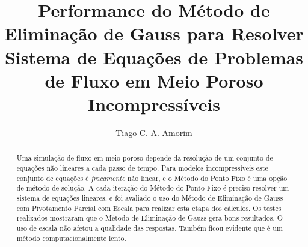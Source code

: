 \documentclass[final,5p]{elsarticle}
\numberwithin{equation}{section}
\begin{document}
\begin{frontmatter}



\title{Performance do Método de Eliminação de Gauss para Resolver Sistema de Equações de Problemas de Fluxo em Meio Poroso Incompressíveis}


\author{Tiago C. A. Amorim}

\begin{abstract}

    Uma simulação de fluxo em meio poroso depende da resolução de um conjunto de equações não lineares a cada passo de tempo. Para modelos incompressíveis este conjunto de equações é \emph{fracamente} não linear, e o Método do Ponto Fixo é uma opção de método de solução. A cada iteração do Método do Ponto Fixo é preciso resolver um sistema de equações lineares, e foi avaliado o uso do Método de Eliminação de Gauss com Pivotamento Parcial com Escala para realizar esta etapa dos cálculos.
    Os testes realizados mostraram que o Método de Eliminação de Gauss gera bons resultados. O uso de escala não afetou a qualidade das respostas. Também ficou evidente que é um método computacionalmente lento.


\end{abstract}
\end{frontmatter}
\end{document}
